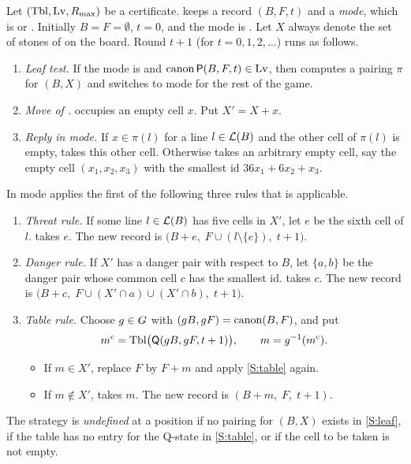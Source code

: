 \begin{definition}\label{def:sigma}
Let $(\mathrm{Tbl},\mathrm{Lv},R_{\max})$ be a certificate. \Breaker{} keeps a record $(B,F,t)$ and a \emph{mode}, which is
\TABLE{} or \PAIRING. Initially $B=F=\emptyset$, $t=0$, and the mode is \TABLE. Let $X$ always denote the set
of stones of \Maker{} on the board. Round $t+1$ (for $t=0,1,2,\dots$) runs as follows.
\begin{enumerate}[label=\textup{(S\arabic*)},leftmargin=3em]
\item\label{S:leaf} \emph{Leaf test.} If the mode is \TABLE{} and $\operatorname{canon}\mathsf{P}(B,F,t)\in\mathrm{Lv}$, then
  \Breaker{} computes a pairing $\pi$ for $(B,X)$ and switches to \PAIRING{} mode for the rest of the game.
\item\label{S:maker} \emph{Move of \Maker.} \Maker{} occupies an empty cell $x$. Put $X'=X+x$.
\item\label{S:pairing} \emph{Reply in \PAIRING{} mode.} If $x\in\pi(l)$ for a line $l\in\mathcal{L}(B)$ and the
  other cell of $\pi(l)$ is empty, \Breaker{} takes this other cell. Otherwise \Breaker{} takes an
  arbitrary empty cell, say the empty cell $(x_1,x_2,x_3)$ with the smallest id $36x_1+6x_2+x_3$.
\end{enumerate}
In \TABLE{} mode \Breaker{} applies the first of the following three rules that is applicable.
\begin{enumerate}[label=\textup{(S\arabic*)},leftmargin=3em,start=4]
\item\label{S:threat} \emph{Threat rule.} If some line $l\in\mathcal{L}(B)$ has five cells in $X'$, let $e$ be the
  sixth cell of $l$. \Breaker{} takes $e$. The new record is
  $\bigl(B+e,\;F\cup(l\setminus\{e\}),\;t+1\bigr)$.
\item\label{S:danger} \emph{Danger rule.} If $X'$ has a danger pair with respect to $B$, let $\{a,b\}$ be the
  danger pair whose common cell $c$ has the smallest id. \Breaker{} takes $c$. The new record is
  $\bigl(B+c,\;F\cup(X'\cap a)\cup(X'\cap b),\;t+1\bigr)$.
\item\label{S:table} \emph{Table rule.} Choose $g\in G$ with $(gB,gF)=\operatorname{canon}(B,F)$, and put
  \[ m^{\mathrm c}=\mathrm{Tbl}\bigl(\mathsf{Q}(gB,gF,t+1)\bigr),\qquad m=g^{-1}(m^{\mathrm c}). \]
  \begin{itemize}[leftmargin=1.5em]
  \item If $m\in X'$, replace $F$ by $F+m$ and apply \ref{S:table} again.
  \item If $m\notin X'$, \Breaker{} takes $m$. The new record is $(B+m,\;F,\;t+1)$.
  \end{itemize}
\end{enumerate}
The strategy is \emph{undefined} at a position if no pairing for $(B,X)$ exists in \ref{S:leaf}, if the table
has no entry for the Q-state in \ref{S:table}, or if the cell to be taken is not empty.
\end{definition}

